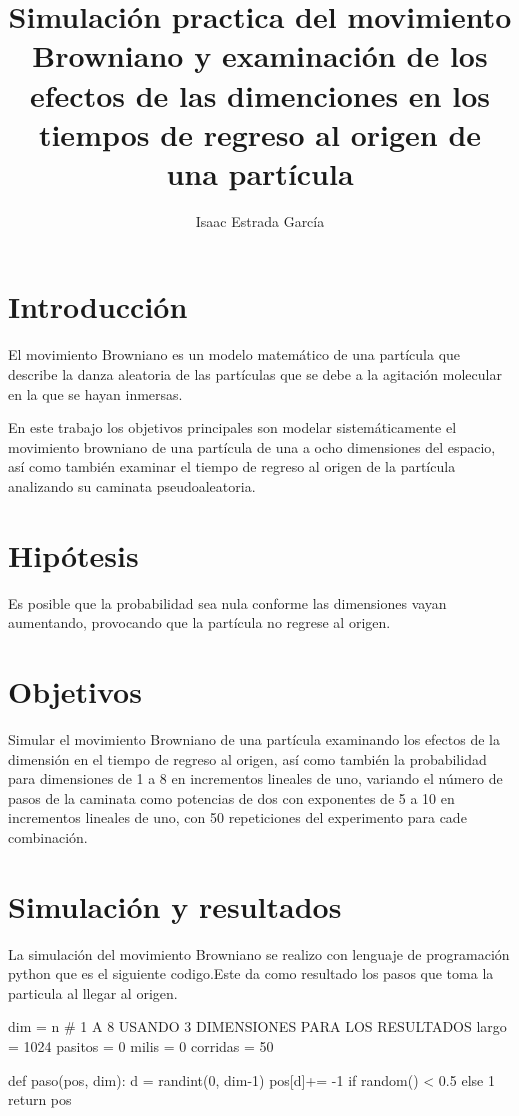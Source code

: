 \documentclass{article}
\title{Simulaci\'{o}n practica del movimiento Browniano y examinaci\'{o}n de los efectos de las dimenciones en los tiempos de regreso al origen de una part\'{i}cula}
\author{Isaac Estrada Garc\'{i}a }
\begin{document}
\maketitle

\section{Introducci\'{o}n}
El movimiento Browniano es un modelo matem\'{a}tico de una part\'{i}cula que describe la danza aleatoria de las part\'{i}culas que se debe a la agitaci\'{o}n molecular en la que se hayan inmersas.

En este trabajo los objetivos principales son modelar sistem\'{a}ticamente el movimiento browniano de una part\'{i}cula de una a ocho dimensiones del espacio, as\'{i} como tambi\'{e}n examinar el tiempo de regreso al origen de la part\'{i}cula analizando su caminata pseudoaleatoria.

\section{Hip\'{o}tesis}
Es posible que la probabilidad sea nula conforme las dimensiones vayan aumentando, provocando que la part\'{i}cula no regrese al origen.
\section{Objetivos}
Simular el movimiento Browniano de una part\'{i}cula examinando los efectos de la dimensi\'{o}n en el tiempo de regreso al origen, as\'{i} como tambi\'{e}n la probabilidad para dimensiones de 1 a 8 en incrementos lineales de uno, variando el n\'{u}mero de pasos de la caminata como potencias de dos con exponentes de 5 a 10 en incrementos lineales de uno, con 50 repeticiones del experimento para cade combinaci\'{o}n. 
\section{Simulaci\'{o}n y resultados}

La simulaci\'{o}n del movimiento Browniano se realizo con lenguaje de programaci\'{o}n python que es el siguiente codigo.Este da como resultado los pasos que toma la particula al llegar al origen.


dim = n # 1 A 8 USANDO 3 DIMENSIONES PARA LOS RESULTADOS
largo = 1024
pasitos = 0
milis = 0
corridas = 50

def paso(pos, dim):
    d = randint(0, dim-1)
    pos[d]+= -1 if random() < 0.5 else 1
    return pos
\end{document}

